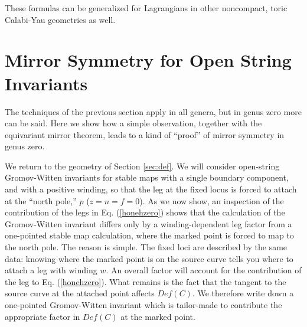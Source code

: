 \documentclass[a4paper,11pt]{article}
\begin{document}
These formulas can be generalized for Lagrangians
in other noncompact, toric Calabi-Yau geometries
as well.

\section{Mirror Symmetry for Open String Invariants}
\label{mirsec}

The techniques of the previous section apply in all
genera, but in genus zero more can be said.
Here we show how a simple observation, together
with the equivariant mirror theorem,
leads to a kind of ``proof'' of mirror symmetry
in genus zero.

We return to the geometry of Section \ref{sec:def}.
We will consider open-string Gromov-Witten invariants
for stable maps with a single boundary component,
and with a positive winding, so that the leg at the fixed
locus is forced to attach at the ``north pole,'' $p$
($z=n=f=0$).
As we now show,
an inspection of the contribution of the legs
in Eq. \!\!(\ref{honehzero}) shows that the calculation
of the Gromov-Witten invariant differs only by a
winding-dependent leg
factor from a one-pointed stable map calculation,
where the marked point is forced to map to the north
pole.  The reason is simple.  The fixed loci are
described by the same data:  knowing where the marked
point is on the source curve tells you where to attach a
leg with winding $w.$  An overall factor will account
for the contribution of the leg to
Eq. \!\!(\ref{honehzero}).  What remains is the fact
that the tangent to the source curve
at the attached point affects
$Def(C).$  We therefore write down a one-pointed
Gromov-Witten invariant which is tailor-made
to contribute the appropriate factor in $Def(C)$
at the marked
point.
\end{document}
